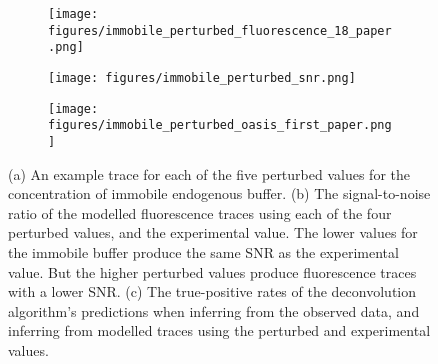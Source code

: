\documentclass[a4paper,12pt]{article}
\theoremstyle{definition}
\begin{document}
\begin{figure}[p]
    \centering
    \begin{subfigure}{0.9\textwidth}
        \texttt{[image: figures/immobile\_perturbed\_fluorescence\_18\_paper.png]}
        \caption{}
    \end{subfigure}
    \newline
    \begin{subfigure}{0.45\textwidth}
        \texttt{[image: figures/immobile\_perturbed\_snr.png]}
        \caption{}
    \end{subfigure}
    \begin{subfigure}{0.45\textwidth}
        \texttt{[image: figures/immobile\_perturbed\_oasis\_first\_paper.png]}
        \caption{}
    \end{subfigure}
    \caption{(a) An example trace for each of the five perturbed values for the concentration of immobile endogenous buffer.	(b) The signal-to-noise ratio of the modelled fluorescence traces using each of the four perturbed values, and the experimental value. The lower values for the immobile buffer produce the same SNR as the experimental value. But the higher perturbed values produce fluorescence traces with a lower SNR.	(c) The true-positive rates of the deconvolution algorithm's predictions when inferring from the observed data, and inferring from modelled traces using the perturbed and experimental values.}
    \label{fig:endogenous_perturbed}
\end{figure}
\end{document}
